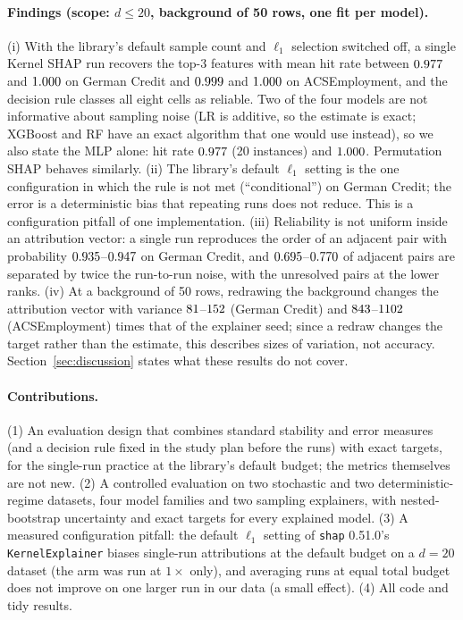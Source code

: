 \paragraph{Findings (scope: $d\le20$, background of 50 rows, one fit per model).} (i) With the library's default sample count and $\ell_1$ selection switched off, a single Kernel SHAP run recovers the top-3 features with mean hit rate between $0.977$ and $1.000$ on German Credit and $0.999$ and $1.000$ on ACSEmployment, and the decision rule classes all eight cells as reliable. Two of the four models are not informative about sampling noise (LR is additive, so the estimate is exact; XGBoost and RF have an exact algorithm that one would use instead), so we also state the MLP alone: hit rate $0.977$ (20 instances) and $1.000$. Permutation SHAP behaves similarly. (ii) The library's default $\ell_1$ setting is the one configuration in which the rule is not met (``conditional'') on German Credit; the error is a deterministic bias that repeating runs does not reduce. This is a configuration pitfall of one implementation. (iii) Reliability is not uniform inside an attribution vector: a single run reproduces the order of an adjacent pair with probability $0.935$--$0.947$ on German Credit, and $0.695$--$0.770$ of adjacent pairs are separated by twice the run-to-run noise, with the unresolved pairs at the lower ranks. (iv) At a background of 50 rows, redrawing the background changes the attribution vector with variance $81$--$152$ (German Credit) and $843$--$1102$ (ACSEmployment) times that of the explainer seed; since a redraw changes the target rather than the estimate, this describes sizes of variation, not accuracy. Section~\ref{sec:discussion} states what these results do not cover.

\paragraph{Contributions.} (1) An evaluation design that combines standard stability and error measures (and a decision rule fixed in the study plan before the runs) with exact targets, for the single-run practice at the library's default budget; the metrics themselves are not new. (2) A controlled evaluation on two stochastic and two deterministic-regime datasets, four model families and two sampling explainers, with nested-bootstrap uncertainty and exact targets for every explained model. (3) A measured configuration pitfall: the default $\ell_1$ setting of \texttt{shap} 0.51.0's \texttt{KernelExplainer} biases single-run attributions at the default budget on a $d=20$ dataset (the arm was run at $1\times$ only), and averaging runs at equal total budget does not improve on one larger run in our data (a small effect). (4) All code and tidy results.
